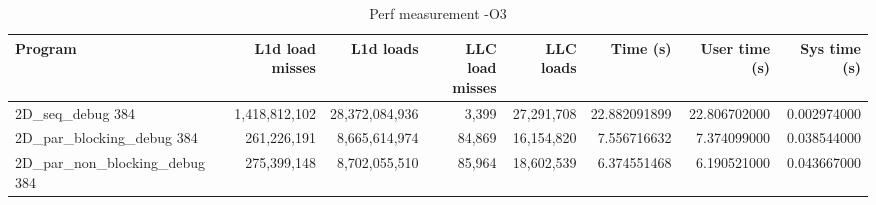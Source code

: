 \begin{table}[H]
\tiny
\centering
\begin{tabular}{|l|r|r|r|r|r|r|r|}
\hline
Program & L1d load misses & L1d loads & LLC load misses & LLC loads & Time (s) & User time (s) & Sys time (s) \\ \hline
2D\_seq\_debug 384 & 1,418,812,102 & 28,372,084,936 & 3,399 & 27,291,708 & 22.882091899 & 22.806702000 & 0.002974000 \\ \hline
2D\_par\_blocking\_debug 384 & 261,226,191 & 8,665,614,974 & 84,869 & 16,154,820 & 7.556716632 & 7.374099000 & 0.038544000 \\ \hline
2D\_par\_non\_blocking\_debug 384 & 275,399,148 & 8,702,055,510 & 85,964 & 18,602,539 & 6.374551468 & 6.190521000 & 0.043667000 \\ \hline
\end{tabular}
\caption{Perf measurement -O3}
\label{table:performance_metrics}
\end{table}
